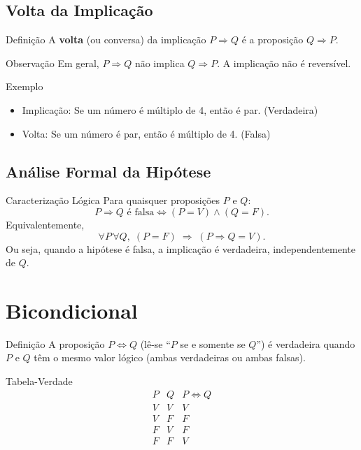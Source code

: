 \documentclass[12pt,a4paper,openright]{book}
\begin{document}
\section{Volta da Implicação}

\begin{block}{Definição}
A \textbf{volta} (ou conversa) da implicação \(P \Rightarrow Q\) é a proposição \(Q \Rightarrow P\).
\end{block}

\begin{block}{Observação}
Em geral, \(P \Rightarrow Q\) não implica \(Q \Rightarrow P\). A implicação não é reversível.
\end{block}

\begin{block}{Exemplo}
\begin{itemize}
    \item Implicação: Se um número é múltiplo de 4, então é par. (Verdadeira)
    \item Volta: Se um número é par, então é múltiplo de 4. (Falsa)
\end{itemize}
\end{block}

\section{Análise Formal da Hipótese}

\begin{block}{Caracterização Lógica}
Para quaisquer proposições \(P\) e \(Q\):
\[
P \Rightarrow Q \text{ é falsa} \iff (P = V) \land (Q = F).
\]
Equivalentemente,
\[
\forall P\,\forall Q,\; (P = F) \;\Rightarrow\; (P \Rightarrow Q = V).
\]
Ou seja, quando a hipótese é falsa, a implicação é verdadeira, independentemente de \(Q\).
\end{block}

\chapter{Bicondicional}

\begin{block}{Definição}
A proposição \(P \Leftrightarrow Q\) (lê-se “\(P\) se e somente se \(Q\)”) é verdadeira quando \(P\) e \(Q\) têm o mesmo valor lógico (ambas verdadeiras ou ambas falsas).
\end{block}

\begin{block}{Tabela-Verdade}
\[
\begin{array}{c|c|c}
P & Q & P \Leftrightarrow Q \\ \hline
V & V & V \\
V & F & F \\
F & V & F \\
F & F & V
\end{array}
\]
\end{block}
\end{document}
